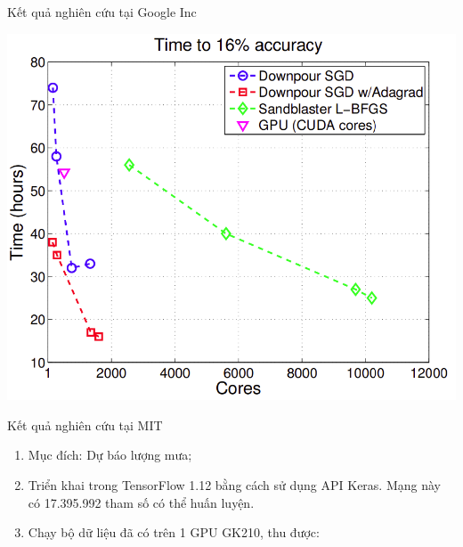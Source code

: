 \documentclass[notheorems,hyperref={bookmarks=true}]{beamer}
\theoremstyle{plain}
\numberwithin{equation}{section}
\begin{document}
\begin{footnotesize}
\begin{frame}{Kết quả nghiên cứu tại Google Inc}
\begin{center}
	\includegraphics[scale=0.45]{GG_5.PNG}
\end{center}
\end{frame}

\begin{frame}{Kết quả nghiên cứu tại MIT}
\begin{enumerate}[-]
	\item Mục đích: Dự báo lượng mưa; \pause
	\item Triển khai trong TensorFlow 1.12 bằng cách sử dụng API Keras. Mạng này có 17.395.992 tham số có thể huấn luyện. \\\pause
	\item Chạy bộ dữ liệu đã có trên 1 GPU GK210, thu được: 	
	

\end{enumerate}
\end{frame}
\end{footnotesize}
\end{document}
